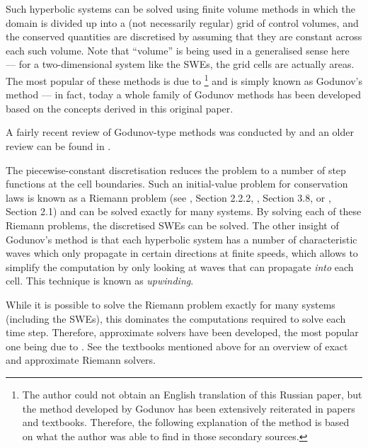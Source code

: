 Such hyperbolic systems can be solved using finite volume methods in which the domain is divided up into a (not necessarily regular) grid of control volumes, and the conserved quantities are discretised by assuming that they are constant across each such volume. Note that ``volume'' is being used in a generalised sense here --- for a two-dimensional system like the SWEs, the grid cells are actually areas. The most popular of these methods is due to \citet{godunov1959difference}\footnote{The author could not obtain an English translation of this Russian paper, but the method developed by Godunov has been extensively reiterated in papers and textbooks. Therefore, the following explanation of the method is based on what the author was able to find in those secondary sources.} and is simply known as Godunov's method --- in fact, today a whole family of Godunov methods has been developed based on the concepts derived in this original paper.

A fairly recent review of Godunov-type methods was conducted by \citet{toro2007godunov} and an older review can be found in \citet{sweby2001godunov}.

The piecewise-constant discretisation reduces the problem to a number of step functions at the cell boundaries. Such an initial-value problem for conservation laws is known as a Riemann problem (see \citet{toro1999riemann}, Section 2.2.2, \citet{leveque2002finite}, Section 3.8, or \citet{toro2007godunov}, Section 2.1) and can be solved exactly for many systems. By solving each of these Riemann problems, the discretised SWEs can be solved. The other insight of Godunov's method is that each hyperbolic system has a number of characteristic waves which only propagate in certain directions at finite speeds, which allows to simplify the computation by only looking at waves that can propagate \emph{into} each cell. This technique is known as \emph{upwinding}.

While it is possible to solve the Riemann problem exactly for many systems (including the SWEs), this dominates the computations required to solve each time step. Therefore, approximate solvers have been developed, the most popular one being due to \citet{roe1981approximate}. See the textbooks mentioned above for an overview of exact and approximate Riemann solvers.

